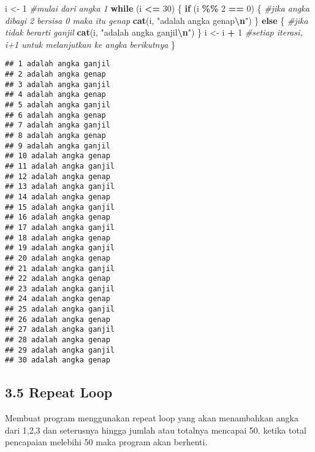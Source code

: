 \documentclass[
]{article}
\newenvironment{Shaded}{\begin{snugshade}}{\end{snugshade}}
\newcommand{\CommentTok}[1]{\textcolor[rgb]{0.56,0.35,0.01}{\textit{#1}}}
\newcommand{\ControlFlowTok}[1]{\textcolor[rgb]{0.13,0.29,0.53}{\textbf{#1}}}
\newcommand{\DecValTok}[1]{\textcolor[rgb]{0.00,0.00,0.81}{#1}}
\newcommand{\FunctionTok}[1]{\textcolor[rgb]{0.13,0.29,0.53}{\textbf{#1}}}
\newcommand{\NormalTok}[1]{#1}
\newcommand{\OtherTok}[1]{\textcolor[rgb]{0.56,0.35,0.01}{#1}}
\newcommand{\SpecialCharTok}[1]{\textcolor[rgb]{0.81,0.36,0.00}{\textbf{#1}}}
\newcommand{\StringTok}[1]{\textcolor[rgb]{0.31,0.60,0.02}{#1}}
\begin{document}
\begin{Shaded}
\begin{Highlighting}[]
\NormalTok{i }\OtherTok{\textless{}{-}} \DecValTok{1} \CommentTok{\#mulai dari angka 1}
\ControlFlowTok{while}\NormalTok{ (i }\SpecialCharTok{\textless{}=} \DecValTok{30}\NormalTok{) \{}
  \ControlFlowTok{if}\NormalTok{ (i }\SpecialCharTok{\%\%} \DecValTok{2} \SpecialCharTok{==} \DecValTok{0}\NormalTok{) \{       }\CommentTok{\#jika angka dibagi 2 bersisa 0 maka itu genap}
    \FunctionTok{cat}\NormalTok{(i, }\StringTok{"adalah angka genap}\SpecialCharTok{\textbackslash{}n}\StringTok{"}\NormalTok{)}
\NormalTok{  \} }\ControlFlowTok{else}\NormalTok{ \{                 }\CommentTok{\#jika tidak berarti ganjil}
  \FunctionTok{cat}\NormalTok{(i, }\StringTok{"adalah angka ganjil}\SpecialCharTok{\textbackslash{}n}\StringTok{"}\NormalTok{)}
\NormalTok{  \}}
\NormalTok{  i }\OtherTok{\textless{}{-}}\NormalTok{ i }\SpecialCharTok{+} \DecValTok{1}    \CommentTok{\#setiap iterasi, i+1 untuk melanjutkan ke angka berikutnya}
\NormalTok{\}}
\end{Highlighting}
\end{Shaded}

\begin{verbatim}
## 1 adalah angka ganjil
## 2 adalah angka genap
## 3 adalah angka ganjil
## 4 adalah angka genap
## 5 adalah angka ganjil
## 6 adalah angka genap
## 7 adalah angka ganjil
## 8 adalah angka genap
## 9 adalah angka ganjil
## 10 adalah angka genap
## 11 adalah angka ganjil
## 12 adalah angka genap
## 13 adalah angka ganjil
## 14 adalah angka genap
## 15 adalah angka ganjil
## 16 adalah angka genap
## 17 adalah angka ganjil
## 18 adalah angka genap
## 19 adalah angka ganjil
## 20 adalah angka genap
## 21 adalah angka ganjil
## 22 adalah angka genap
## 23 adalah angka ganjil
## 24 adalah angka genap
## 25 adalah angka ganjil
## 26 adalah angka genap
## 27 adalah angka ganjil
## 28 adalah angka genap
## 29 adalah angka ganjil
## 30 adalah angka genap
\end{verbatim}

\subsection{3.5 Repeat Loop}\label{repeat-loop-1}

Membuat program menggunakan repeat loop yang akan menambahkan angka dari
1,2,3 dan seterusnya hingga jumlah atau totalnya mencapai 50. ketika
total pencapaian melebihi 50 maka program akan berhenti.
\end{document}

